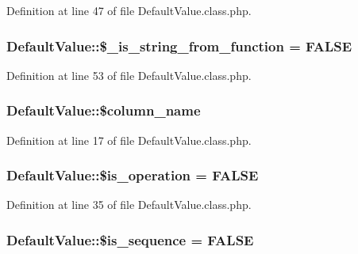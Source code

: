 Definition at line 47 of file Default\-Value.\-class.\-php.

\hypertarget{classDefaultValue_a000cf284b962d5c3354abd73b611c888}{
\subsubsection[{\$\-\_\-is\-\_\-string\-\_\-from\-\_\-function}]{\setlength{\rightskip}{0pt plus 5cm}Default\-Value\-::\$\-\_\-is\-\_\-string\-\_\-from\-\_\-function = F\-A\-L\-S\-E}}\label{classDefaultValue_a000cf284b962d5c3354abd73b611c888}


Definition at line 53 of file Default\-Value.\-class.\-php.

\hypertarget{classDefaultValue_a671e32e797e9975b6497a56a5ba92dc6}{
\subsubsection[{\$column\-\_\-name}]{\setlength{\rightskip}{0pt plus 5cm}Default\-Value\-::\$column\-\_\-name}}\label{classDefaultValue_a671e32e797e9975b6497a56a5ba92dc6}


Definition at line 17 of file Default\-Value.\-class.\-php.

\hypertarget{classDefaultValue_ae01855465814b8be26de7bd0b33b6778}{
\subsubsection[{\$is\-\_\-operation}]{\setlength{\rightskip}{0pt plus 5cm}Default\-Value\-::\$is\-\_\-operation = F\-A\-L\-S\-E}}\label{classDefaultValue_ae01855465814b8be26de7bd0b33b6778}


Definition at line 35 of file Default\-Value.\-class.\-php.

\hypertarget{classDefaultValue_a7ad2c3e04c79053b6299c0fa0e35389e}{
\subsubsection[{\$is\-\_\-sequence}]{\setlength{\rightskip}{0pt plus 5cm}Default\-Value\-::\$is\-\_\-sequence = F\-A\-L\-S\-E}}\label{classDefaultValue_a7ad2c3e04c79053b6299c0fa0e35389e}


